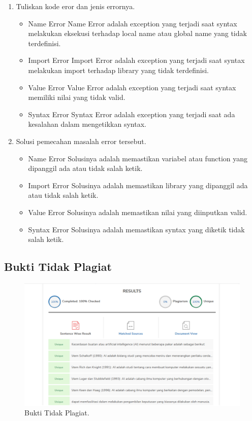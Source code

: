 \begin{enumerate}
	\item Tuliskan kode eror dan jenis errornya.
	\begin{itemize}
		\item Name Error
		\hfill\break
		Name Error adalah exception yang terjadi saat syntax melakukan eksekusi terhadap local name atau global name yang tidak terdefinisi.
		\item Import Error
		\hfill\break
		Import Error adalah exception yang terjadi saat syntax melakukan import terhadap library yang tidak terdefinisi.
		\item Value Error
		\hfill\break
		Value Error adalah exception yang terjadi saat syntax memiliki nilai yang tidak valid.
		\item Syntax Error
		\hfill\break
		Syntax Error adalah exception yang terjadi saat ada kesalahan dalam mengetikkan syntax.
	\end{itemize}
	\item Solusi pemecahan masalah error tersebut.
	\begin{itemize}
		\item Name Error
		\hfill\break
		Solusinya adalah memastikan variabel atau function yang dipanggil ada atau tidak salah ketik.
		\item Import Error
		\hfill\break
		Solusinya adalah memastikan library yang dipanggil ada atau tidak salah ketik.
		\item Value Error
		\hfill\break
		Solusinya adalah memastikan nilai yang diinputkan valid.
		\item Syntax Error
		\hfill\break
		Solusinya adalah memastikan syntax yang diketik tidak salah ketik.
	\end{itemize}
\end{enumerate}

\subsection{Bukti Tidak Plagiat}
\begin{figure}[H]
	\includegraphics[width=1\textwidth]{figures/1174006/chapter1/plagiat.png}
	\centering
	\caption{Bukti Tidak Plagiat.}
\end{figure}